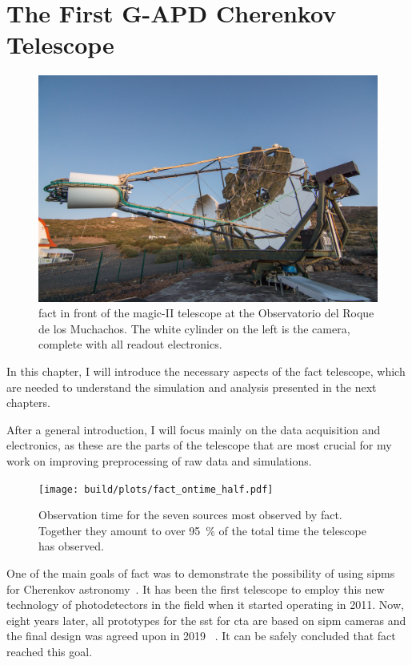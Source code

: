\chapter{The First G-APD Cherenkov Telescope}\label{chp:fact}
\begin{figure}
  \centering
  \includegraphics[width=\textwidth]{images/fact.jpg}
  \caption{%
    \gls{fact} in front of the \gls{magic}-II telescope at the Observatorio del Roque de los Muchachos.
    The white cylinder on the left is the camera, complete with all readout electronics.
    }%
  \label{fig:a}
\end{figure}


\noindent In this chapter, I will introduce the necessary aspects
of the \gls{fact} telescope, which are needed to understand the simulation
and analysis presented in the next chapters.

After a general introduction,
I will focus mainly on the data acquisition and electronics,
as these are the parts of the telescope that are most crucial for my work
on improving preprocessing of raw data and simulations.

\begin{figure}
  \centering
  \texttt{[image: build/plots/fact\_ontime\_half.pdf]}
  \caption{%
    Observation time for the seven sources most observed by \gls{fact}. 
    Together they amount to over \SI{95}{\percent} of the total time the telescope
    has observed.
  }\label{fig:obstime}
\end{figure}

One of the main goals of \gls{fact} was to demonstrate the possibility
of using \glspl{sipm} for Cherenkov astronomy~\cite{fact-design-operation}.
It has been the first telescope to employ this new technology of photodetectors
in the field when it started operating in 2011.
Now, eight years later, all prototypes for the \gls{sst} for \gls{cta} are based 
on \gls{sipm} cameras and the final design was agreed upon in 2019~
\cite{sst-harmonization}. 
It can be safely concluded that \gls{fact} reached this goal.

